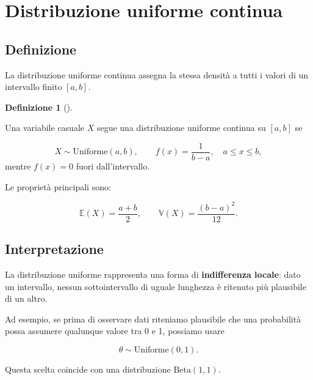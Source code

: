\documentclass[
  italian,
  letterpaper,
  a4paper,
  11pt,
  open=any]{scrbook}
\theoremstyle{plain}
\theoremstyle{definition}
\theoremstyle{definition}
\newtheorem{definition}{Definizione}[chapter]
\theoremstyle{remark}
\begin{document}
\section{Distribuzione uniforme continua}\label{sec-cont-uniform}

\subsection{Definizione}\label{definizione-4}

La distribuzione uniforme continua assegna la stessa densità a tutti i
valori di un intervallo finito \([a,b]\).

\begin{definition}[]\protect\hypertarget{def-uniform-cont}{}\label{def-uniform-cont}

Una variabile casuale \(X\) segue una distribuzione uniforme continua su
\([a,b]\) se

\[
X \sim \mathrm{Uniforme}(a,b),
\qquad
f(x) = \frac{1}{b-a}, \quad a \leq x \leq b,
\] mentre \(f(x)=0\) fuori dall'intervallo.

Le proprietà principali sono:

\[
\mathbb{E}(X) = \frac{a+b}{2},
\qquad
\mathbb{V}(X) = \frac{(b-a)^2}{12}.
\]

\end{definition}

\subsection{Interpretazione}\label{interpretazione}

La distribuzione uniforme rappresenta una forma di \textbf{indifferenza
locale}: dato un intervallo, nessun sottointervallo di uguale lunghezza
è ritenuto più plausibile di un altro.

Ad esempio, se prima di osservare dati riteniamo plausibile che una
probabilità possa assumere qualunque valore tra 0 e 1, possiamo usare

\[
\theta \sim \mathrm{Uniforme}(0,1).
\]

Questa scelta coincide con una distribuzione \(\mathrm{Beta}(1,1)\).
\end{document}
